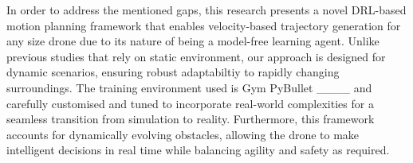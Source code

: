 In order to address the mentioned gaps, this research presents a novel DRL-based motion planning framework that enables velocity-based trajectory generation for any size drone due to its nature of being a model-free learning agent. Unlike previous studies that rely on static environment, our approach is designed for dynamic scenarios, ensuring robust adaptabiltiy to rapidly changing surroundings. The training environment used is Gym PyBullet ____ and carefully customised and tuned to incorporate real-world complexities for a seamless transition from simulation to reality. Furthermore, this framework accounts for dynamically evolving obstacles, allowing the drone to make intelligent decisions in real time while balancing agility and safety as required.
